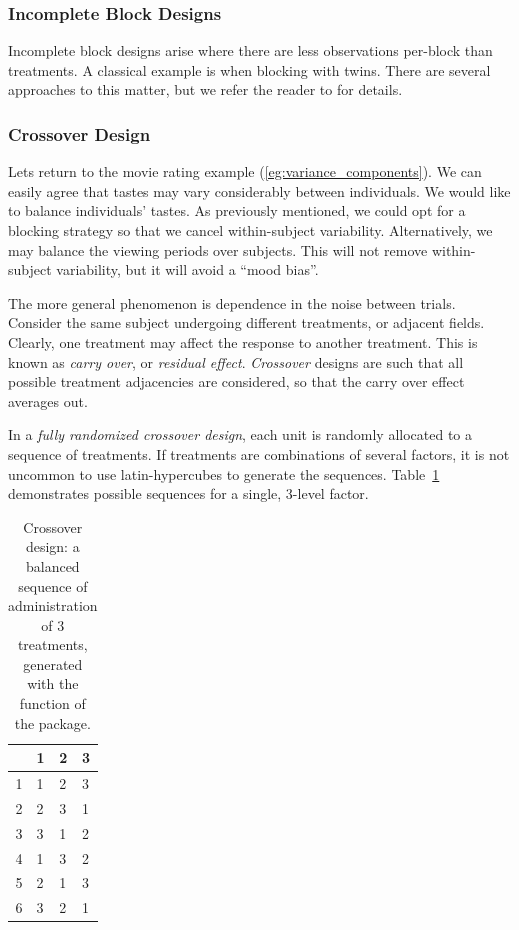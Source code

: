 \subsubsection{Incomplete Block Designs}
Incomplete block designs arise where there are less observations per-block than treatments. 
A classical example is when blocking with twins.
There are several approaches to this matter, but we refer the reader to \cite[Sec.4.2]{cox_theory_2000} for details.




\subsubsection{Crossover Design}
Lets return to the movie rating example (\ref{eg:variance_components}).
We can easily agree that tastes may vary considerably between individuals. 
We would like to balance individuals' tastes.
As previously mentioned, we could opt for a blocking strategy so that we cancel within-subject variability.
Alternatively, we may balance the viewing periods over subjects. 
This will not remove within-subject variability, but it will avoid a ``mood bias''.

The more general phenomenon is dependence in the noise between trials. 
Consider the same subject undergoing different treatments, or adjacent fields. 
Clearly, one treatment may affect the response to another treatment. This is known as \emph{carry over}, or \emph{residual effect}. 
\emph{Crossover} designs are such that all possible treatment adjacencies are considered, so that the carry over effect averages out. 

In a \emph{fully randomized crossover design}, each unit is randomly allocated to a sequence of treatments.
If treatments are combinations of several factors, it is not uncommon to use latin-hypercubes to generate the sequences. Table~\ref{tab:crossover} demonstrates possible sequences for a single, $3$-level factor.
\begin{table}[ht]
\centering
\begin{tabular}{rlll}
  \hline
 & 1 & 2 & 3 \\ 
  \hline
1 & 1 & 2 & 3 \\ 
  2 & 2 & 3 & 1 \\ 
  3 & 3 & 1 & 2 \\ 
  4 & 1 & 3 & 2 \\ 
  5 & 2 & 1 & 3 \\ 
  6 & 3 & 2 & 1 \\ 
   \hline
\end{tabular}
\label{tab:crossover}
\caption{Crossover design: a balanced sequence of administration of $3$ treatments, generated with the  function of the  \R package. }
\end{table}






